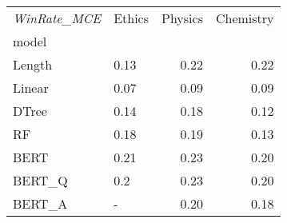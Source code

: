 \begin{tabular}{llrr}
\toprule
\textit{WinRate\_MCE} & Ethics &  Physics &  Chemistry \\
model  &        &          &            \\
\midrule
Length &   0.13 &     0.22 &       0.22 \\
Linear &   0.07 &     0.09 &       0.09 \\
DTree  &   0.14 &     0.18 &       0.12 \\
RF     &   0.18 &     0.19 &       0.13 \\
BERT   &   0.21 &     0.23 &       0.20 \\
BERT\_Q &    0.2 &     0.23 &       0.20 \\
BERT\_A &      - &     0.20 &       0.18 \\
\bottomrule
\end{tabular}
